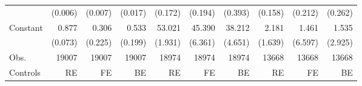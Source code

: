 {\begin{tabular}{l*{9}{D{.}{.}{-1}}}
                    &     (0.006)         &     (0.007)         &     (0.017)         &     (0.172)         &     (0.194)         &     (0.393)         &     (0.158)         &     (0.212)         &     (0.262)         \\
\addlinespace
Constant            &       0.877\sym{***}&       0.306         &       0.533\sym{***}&      53.021\sym{***}&      45.390\sym{***}&      38.212\sym{***}&       2.181         &       1.461         &       1.535         \\
                    &     (0.073)         &     (0.225)         &     (0.199)         &     (1.931)         &     (6.361)         &     (4.651)         &     (1.639)         &     (6.597)         &     (2.925)         \\
\midrule
Obs.                &       19007         &       19007         &       19007         &       18974         &       18974         &       18974         &       13668         &       13668         &       13668         \\
Controls            &          RE         &          FE         &          BE         &          RE         &          FE         &          BE         &          RE         &          FE         &          BE         \\
\bottomrule
\end{tabular}
}
